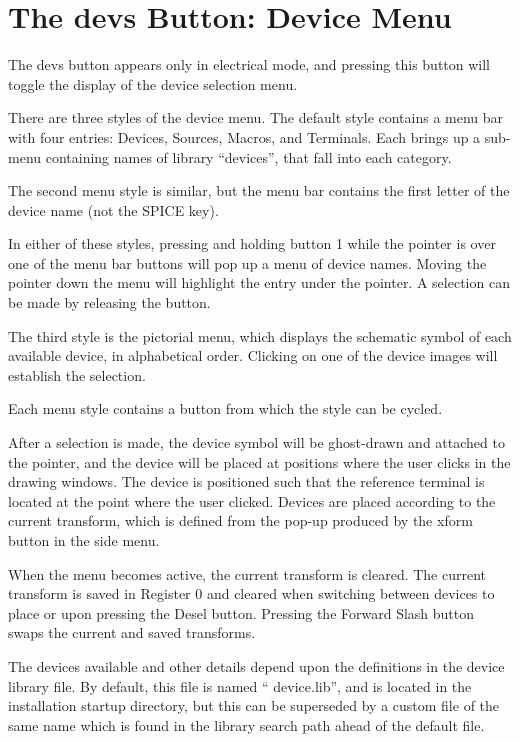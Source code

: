 \section{The {\cb devs} Button: Device Menu}
\label{devmenu}

The {\cb devs} button appears only in electrical mode, and pressing
this button will toggle the display of the device selection menu.

There are three styles of the device menu.  The default style contains
a menu bar with four entries:  {\cb Devices}, {\cb Sources}, {\cb
Macros}, and {\cb Terminals}.  Each brings up a sub-menu containing
names of library ``devices'', that fall into each category.

The second menu style is similar, but the menu bar contains the first
letter of the device name (not the SPICE key).

In either of these styles, pressing and holding button 1 while the
pointer is over one of the menu bar buttons will pop up a menu of
device names.  Moving the pointer down the menu will highlight the
entry under the pointer.  A selection can be made by releasing the
button.

The third style is the pictorial menu, which displays the schematic
symbol of each available device, in alphabetical order.  Clicking on
one of the device images will establish the selection.

Each menu style contains a button from which the style can be cycled.

After a selection is made, the device symbol will be ghost-drawn and
attached to the pointer, and the device will be placed at positions
where the user clicks in the drawing windows.  The device is
positioned such that the reference terminal is located at the point
where the user clicked.  Devices are placed according to the current
transform, which is defined from the pop-up produced by the {\cb
xform} button in the side menu.

When the menu becomes active, the current transform is cleared.  The
current transform is saved in Register 0 and cleared when switching
between devices to place or upon pressing the {\cb Desel} button.
Pressing the {\kb Forward Slash} button swaps the current and saved
transforms.

The devices available and other details depend upon the definitions in
the device library file.  By default, this file is named ``{\vt
device.lib}'', and is located in the installation startup directory,
but this can be superseded by a custom file of the same name which is
found in the library search path ahead of the default file.

